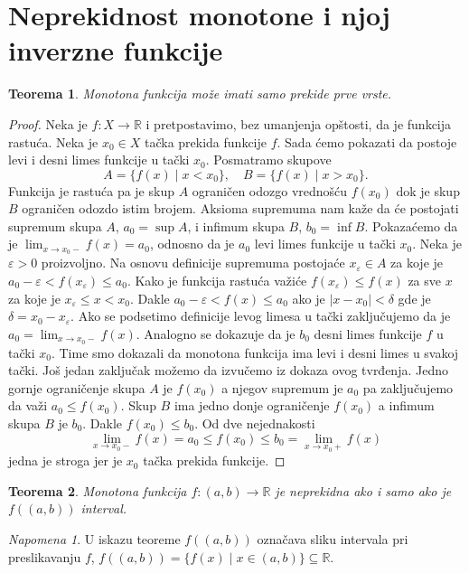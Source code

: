 \documentclass[a4paper,12pt]{article}
\theoremstyle{plain}
\newtheorem{theorem}{Teorema}[section]
\theoremstyle{definition}
\theoremstyle{remark}
\newtheorem*{remark}{Napomena}
\begin{document}
\section{Neprekidnost monotone i njoj inverzne funkcije}

\begin{theorem}
Monotona funkcija može imati samo prekide prve vrste.
\end{theorem}

\begin{proof}
Neka je $f : X \rightarrow \mathbb{R}$ i pretpostavimo, bez umanjenja opštosti, da je funkcija rastuća. Neka je $x_0 \in X$ tačka prekida funkcije $f$. Sada ćemo pokazati da postoje levi i desni limes funkcije u tački $x_0$. Posmatramo skupove
$$A = \{f(x) \mid x < x_0\}, \quad B = \{f(x) \mid x > x_0\}.$$
Funkcija je rastuća pa je skup $A$ ograničen odozgo vrednošću $f(x_0)$ dok je skup $B$ ograničen odozdo istim brojem. Aksioma supremuma nam kaže da će postojati supremum skupa $A$, $a_0 = \sup A$, i infimum skupa $B$, $b_0 = \inf B$. Pokazaćemo da je $\lim_{x \to x_0-} f(x) = a_0$, odnosno da je $a_0$ levi limes funkcije u tački $x_0$. Neka je $\varepsilon > 0$ proizvoljno. Na osnovu definicije supremuma postojaće $x_\varepsilon \in A$ za koje je $a_0 - \varepsilon < f(x_\varepsilon) \le a_0$. Kako je funkcija rastuća važiće $f(x_\varepsilon) \le f(x)$ za sve $x$ za koje je $x_\varepsilon \le x < x_0$. Dakle $a_0 - \varepsilon < f(x) \le a_0$ ako je $|x - x_0| < \delta$ gde je $\delta = x_0 - x_\varepsilon$. Ako se podsetimo definicije levog limesa u tački zaključujemo da je $a_0 = \lim_{x \to x_0-} f(x)$. Analogno se dokazuje da je $b_0$ desni limes funkcije $f$ u tački $x_0$. Time smo dokazali da monotona funkcija ima levi i desni limes u svakoj tački. Još jedan zaključak možemo da izvučemo iz dokaza ovog tvrđenja. Jedno gornje ograničenje skupa $A$ je $f(x_0)$ a njegov supremum je $a_0$ pa zaključujemo da važi $a_0 \le f(x_0)$. Skup $B$ ima jedno donje ograničenje $f(x_0)$ a infimum skupa $B$ je $b_0$. Dakle $f(x_0) \le b_0$. Od dve nejednakosti
$$\lim_{x \to x_0-} f(x) = a_0 \le f(x_0) \le b_0 = \lim_{x \to x_0+} f(x)$$
jedna je stroga jer je $x_0$ tačka prekida funkcije.
\end{proof}

\begin{theorem}
Monotona funkcija $f : (a,b) \rightarrow \mathbb{R}$ je neprekidna ako i samo ako je $f((a,b))$ interval.
\end{theorem}

\begin{remark}
U iskazu teoreme $f((a,b))$ označava sliku intervala pri preslikavanju $f$, $f((a,b)) = \{f(x) \mid x \in (a,b)\} \subseteq \mathbb{R}$.
\end{remark}
\end{document}
